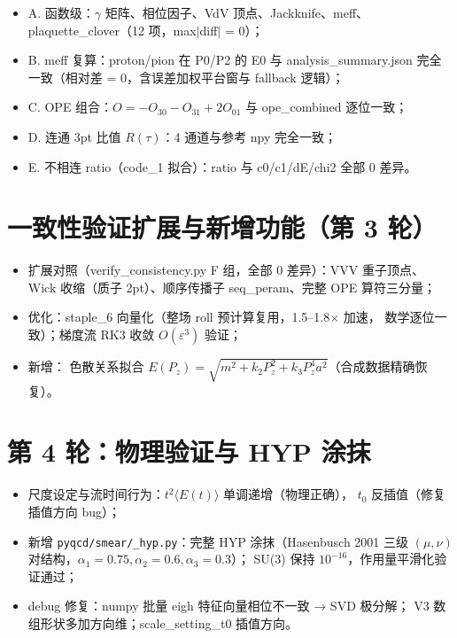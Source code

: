\documentclass[12pt,a4paper]{ctexart}
\begin{document}
\begin{itemize}
  \item A. 函数级：$\gamma$ 矩阵、相位因子、VdV 顶点、Jackknife、meff、
        plaquette\_clover（12 项，max$|$diff$|$ = 0）；
  \item B. meff 复算：proton/pion 在 P0/P2 的 E0 与 analysis\_summary.json
        完全一致（相对差 = 0，含误差加权平台窗与 fallback 逻辑）；
  \item C. OPE 组合：$O = -O_{30} - O_{31} + 2O_{01}$ 与 ope\_combined 逐位一致；
  \item D. 连通 3pt 比值 $R(\tau)$：4 通道与参考 npy 完全一致；
  \item E. 不相连 ratio（code\_1 拟合）：ratio 与 c0/c1/dE/chi2 全部 0 差异。
\end{itemize}

\section{一致性验证扩展与新增功能（第 3 轮）}

\begin{itemize}
  \item 扩展对照（verify\_consistency.py F 组，全部 0 差异）：VVV 重子顶点、
        Wick 收缩（质子 2pt）、顺序传播子 seq\_peram、完整 OPE 算符三分量；
  \item 优化：staple\_6 向量化（整场 roll 预计算复用，1.5--1.8$\times$ 加速，
        数学逐位一致）；梯度流 RK3 收敛 $O(\varepsilon^3)$ 验证；
  \item 新增： 色散关系拟合
        $E(P_z) = \sqrt{m^2 + k_2 P_z^2 + k_3 P_z^4 a^2}$（合成数据精确恢复）。
\end{itemize}

\section{第 4 轮：物理验证与 HYP 涂抹}

\begin{itemize}
  \item 尺度设定与流时间行为：$t^2\langle E(t)\rangle$ 单调递增（物理正确），
        $t_0$ 反插值（修复插值方向 bug）；
  \item 新增 \texttt{pyqcd/smear/\_hyp.py}：完整 HYP 涂抹（Hasenbusch 2001
        三级 $(\mu,\nu)$ 对结构，$\alpha_1{=}0.75, \alpha_2{=}0.6, \alpha_3{=}0.3$）；
        SU(3) 保持 $10^{-16}$，作用量平滑化验证通过；
  \item debug 修复：numpy 批量 eigh 特征向量相位不一致 → SVD 极分解；
        V3 数组形状多加方向维；scale\_setting\_t0 插值方向。
\end{itemize}
\end{document}
